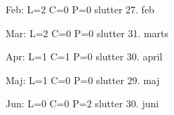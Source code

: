 Feb:    L=2     C=0     P=0      slutter 27. feb

Mar:    L=2     C=0     P=0      slutter 31. marts

Apr:    L=1     C=1     P=0      slutter 30. april

Maj:    L=1     C=0     P=0      slutter 29. maj

Jun:    L=0     C=0     P=2      slutter 30. juni